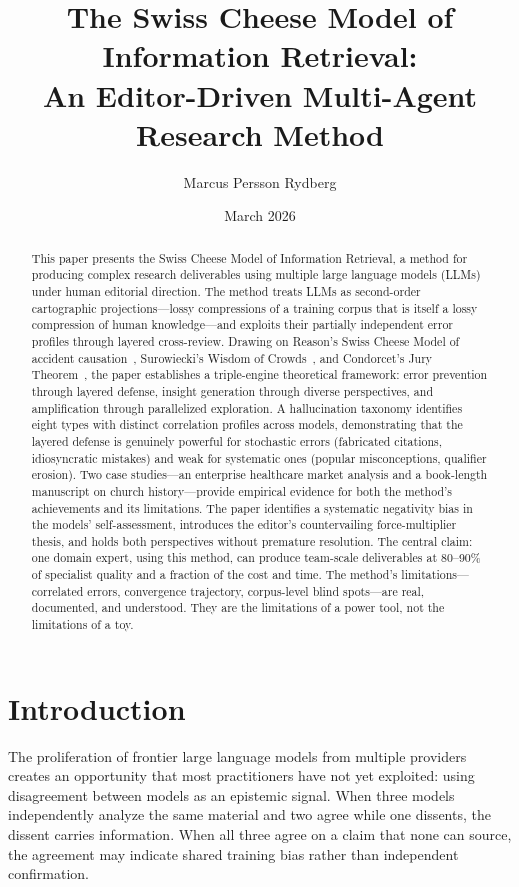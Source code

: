 \documentclass[11pt,letterpaper]{article}
\title{The Swiss Cheese Model of Information Retrieval:\\
An Editor-Driven Multi-Agent Research Method}
\author{Marcus Persson Rydberg}
\date{March 2026}
\begin{document}
\maketitle

\begin{abstract}
This paper presents the Swiss Cheese Model of Information Retrieval, a method for producing complex research deliverables using multiple large language models (LLMs) under human editorial direction. The method treats LLMs as second-order cartographic projections---lossy compressions of a training corpus that is itself a lossy compression of human knowledge---and exploits their partially independent error profiles through layered cross-review. Drawing on Reason's Swiss Cheese Model of accident causation~\cite{reason1990}, Surowiecki's Wisdom of Crowds~\cite{surowiecki2004}, and Condorcet's Jury Theorem~\cite{condorcet1785}, the paper establishes a triple-engine theoretical framework: error prevention through layered defense, insight generation through diverse perspectives, and amplification through parallelized exploration. A hallucination taxonomy identifies eight types with distinct correlation profiles across models, demonstrating that the layered defense is genuinely powerful for stochastic errors (fabricated citations, idiosyncratic mistakes) and weak for systematic ones (popular misconceptions, qualifier erosion). Two case studies---an enterprise healthcare market analysis and a book-length manuscript on church history---provide empirical evidence for both the method's achievements and its limitations. The paper identifies a systematic negativity bias in the models' self-assessment, introduces the editor's countervailing force-multiplier thesis, and holds both perspectives without premature resolution. The central claim: one domain expert, using this method, can produce team-scale deliverables at 80--90\% of specialist quality and a fraction of the cost and time. The method's limitations---correlated errors, convergence trajectory, corpus-level blind spots---are real, documented, and understood. They are the limitations of a power tool, not the limitations of a toy.
\end{abstract}

\section{Introduction}

The proliferation of frontier large language models from multiple providers creates an opportunity that most practitioners have not yet exploited: using disagreement between models as an epistemic signal. When three models independently analyze the same material and two agree while one dissents, the dissent carries information. When all three agree on a claim that none can source, the agreement may indicate shared training bias rather than independent confirmation.
\end{document}
